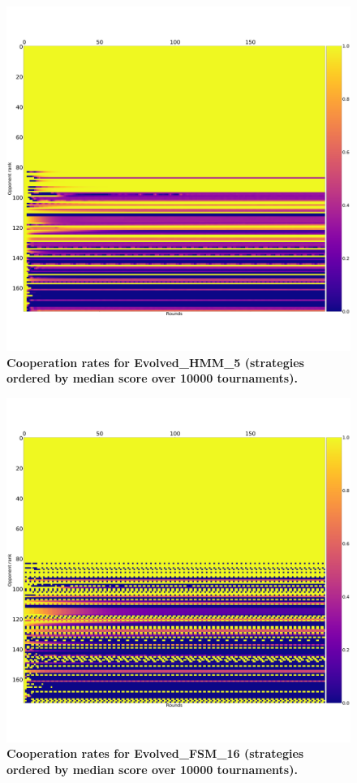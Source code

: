 \documentclass[10pt,letterpaper]{article}
\begin{document}
\begin{figure}[!hbtp]
        \centering
        \includegraphics[width=.7\textwidth]{cooperation_0_0_10000_Evolved_HMM_5_array.pdf}
        \caption{\bf Cooperation rates for Evolved\_HMM\_5
            (strategies ordered by median score over 10000 tournaments).}
        \label{fig:comparison_cooperation_heatmaps_standard_2}
\end{figure}

\begin{figure}[!hbtp]
        \centering
        \includegraphics[width=.7\textwidth]{cooperation_0_0_10000_Evolved_FSM_16_array.pdf}
        \caption{\bf Cooperation rates for Evolved\_FSM\_16 
            (strategies ordered by median score over 10000 tournaments).}
        \label{fig:comparison_cooperation_heatmaps_standard_3}
\end{figure}
\end{document}
